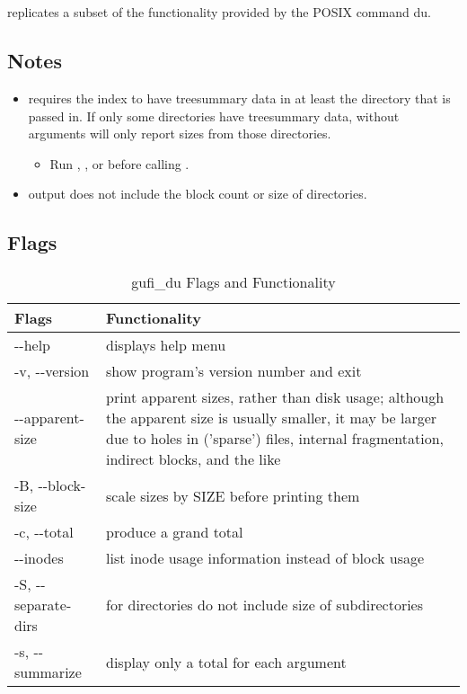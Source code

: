 \section{\gufidu}
\gufidu replicates a subset of the functionality provided by the POSIX
command du.

\subsection{Notes}
\begin{itemize}
\item \gufidu requires the index to have treesummary data in at least
  the directory that is passed in. If only some directories have
  treesummary data, \gufidu without arguments will only report sizes
  from those directories.
  \begin{itemize}
  \item Run \gufitreesummary, \gufitreesummaryall, or \gufirollup
    before calling \gufidu.
  \end{itemize}
\item \gufidu output does not include the block count or size of
  directories.
\end{itemize}

\subsection{Flags}
\begin{table} [h!]
  \centering
  \begin{tabularx}{\textwidth}{| l | X |}
    \hline
    Flags & Functionality \\
    \hline
    -{}-help & displays help menu \\
    \hline
    -v, -{}-version & show program's version number and exit \\
    \hline
    -{}-apparent-size & print apparent sizes, rather than disk usage;
    although the apparent size is usually smaller, it may be larger
    due to holes in ('sparse') files, internal fragmentation, indirect
    blocks, and the like \\
    \hline
    -B, -{}-block-size & scale sizes by SIZE before printing them \\
    \hline
    -c, -{}-total & produce a grand total \\
    \hline
    -{}-inodes & list inode usage information instead of block usage \\
    \hline
    -S, -{}-separate-dirs & for directories do not include size of subdirectories \\
    \hline
    -s, -{}-summarize & display only a total for each argument \\
    \hline
  \end{tabularx}
  \caption{\label{fig:gufi_du flags}{gufi\_du Flags and Functionality}}
\end{table}
